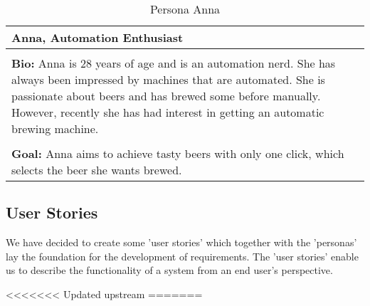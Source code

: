 \begin{table}[H]
    \begin{center}
        \begin{tabular}{|p{16cm}|}
            \hline
            \textbf{Anna, Automation Enthusiast}                                                                                                                                                              \\
            \hline
            \\ \textbf{Bio:} Anna is 28 years of age and is an automation nerd. She has always been impressed by machines that are automated. She is passionate about beers and has brewed some before manually. However, recently she has had interest in getting an automatic brewing machine.  \\
            \\
            \textbf{Goal:} Anna aims to achieve tasty beers with only one click, which selects the beer she wants brewed.\\
            \hline
        \end{tabular}
        \caption{Persona Anna}
        \label{tab:persona_anna}
    \end{center}
\end{table}

\subsection{User Stories}

We have decided to create some 'user stories' which together with the 'personas' lay the foundation for the development of requirements.
The 'user stories' enable us to describe the functionality of a system from an end user's perspective.

<<<<<<< Updated upstream
=======

